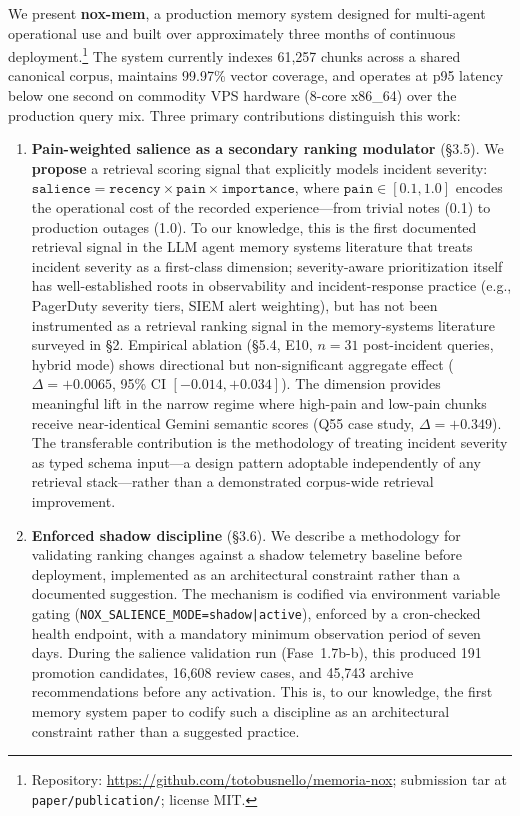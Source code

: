 We present \textbf{nox-mem}, a production memory system designed for multi-agent
operational use and built over approximately three months of continuous deployment.\footnote{Repository:
\url{https://github.com/totobusnello/memoria-nox}; submission tar at
\texttt{paper/publication/}; license MIT.} The system currently indexes 61,257 chunks
across a shared canonical corpus, maintains 99.97\% vector coverage, and operates at p95
latency below one second on commodity VPS hardware (8-core x86\_64) over the production
query mix. Three primary contributions distinguish this work:

\begin{enumerate}

\item \textbf{Pain-weighted salience as a secondary ranking modulator} (\S3.5). We
\textbf{propose} a retrieval scoring signal that explicitly models incident severity:
$\texttt{salience} = \texttt{recency} \times \texttt{pain} \times \texttt{importance}$,
where $\texttt{pain} \in [0.1, 1.0]$ encodes the operational cost of the recorded
experience---from trivial notes (0.1) to production outages (1.0). To our knowledge, this
is the first documented retrieval signal in the LLM agent memory systems literature that
treats incident severity as a first-class dimension; severity-aware prioritization itself
has well-established roots in observability and incident-response practice
(e.g., PagerDuty severity tiers, SIEM alert weighting), but has not been instrumented as
a retrieval ranking signal in the memory-systems literature surveyed in \S2.
Empirical ablation (\S5.4, E10, $n=31$
post-incident queries, hybrid mode) shows directional but non-significant aggregate effect
($\Delta = +0.0065$, 95\% CI $[-0.014, +0.034]$). The dimension provides meaningful lift
in the narrow regime where high-pain and low-pain chunks receive near-identical Gemini
semantic scores (Q55 case study, $\Delta = +0.349$). The transferable contribution is the
methodology of treating incident severity as typed schema input---a design pattern adoptable
independently of any retrieval stack---rather than a demonstrated corpus-wide retrieval
improvement.

\item \textbf{Enforced shadow discipline} (\S3.6). We describe a methodology for
validating ranking changes against a shadow telemetry baseline before deployment,
implemented as an architectural constraint rather than a documented suggestion. The
mechanism is codified via environment variable gating
(\texttt{NOX\_SALIENCE\_MODE=shadow|active}), enforced by a cron-checked health endpoint,
with a mandatory minimum observation period of seven days. During the salience validation
run (Fase~1.7b-b), this produced 191 promotion candidates, 16,608 review cases, and
45,743 archive recommendations before any activation. This is, to our knowledge, the first
memory system paper to codify such a discipline as an architectural constraint rather than
a suggested practice.


\end{enumerate}
